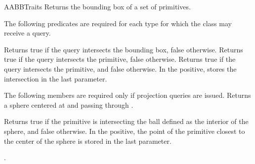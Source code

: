 \begin{ccRefConcept}{AABBTraits}
{Returns the bounding box of a set of primitives.}

The following predicates are required for each type 
for which the class  may receive a query.

{Returns true if the query intersects the bounding box, false otherwise.}
\ccGlue	
{}
{Returns true if the query intersects the primitive, false otherwise.}
\ccGlue	
{}
{Returns true if the query intersects the primitive, and false otherwise. In the positive, stores the intersection in the last parameter. }




The following members are required only if projection queries are issued.
{Returns a sphere centered at  and passing through .}

{Returns true if the primitive is intersecting the ball defined as the interior of the sphere, and false otherwise. In the positive, the point of the primitive closest to the center of the sphere is stored in the last parameter.}


\ccHasModels

.


\ccSeeAlso
{}\\






\end{ccRefConcept}

\ccRefPageEnd

